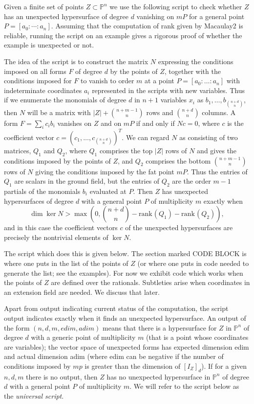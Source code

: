 \documentclass[12pt]{amsart}
\numberwithin{equation}{section}
\theoremstyle{definition}
\newcommand{\PP}{ \ensuremath{\mathbb{P}}}
\newcommand{\rank}{\ensuremath{\mathrm{rank}}\hspace{1pt}}
\begin{document}
Given a finite set of points $Z\subset\PP^n$ we use the following script to check whether $Z$ has an
unexpected hypersurface of degree $d$ vanishing on $mP$ for a general point $P=[a_0:\cdots:a_n]$. 
Assuming that the computation of rank given by Macaulay2 is reliable,
running the script on an example gives a rigorous proof of whether the example is unexpected or not. 

The idea of the script is to construct the matrix $N$ expressing the conditions imposed on
all forms $F$ of degree $d$ by the points of $Z$, together with the conditions imposed for $F$ to vanish to order $m$ at a point
$P=[a_0:\ldots:a_n]$ with indeterminate coordinates $a_i$ represented in the scripts with new variables. 
Thus if we enumerate the monomials of degree $d$ in $n+1$ variables $x_i$
as $b_1,\ldots,b_{\binom{n+d}{n}}$, then $N$ will be a matrix with $|Z|+\binom{n+m-1}{n}$ rows and $\binom{n+d}{n}$ columns.
A form $F=\sum_ic_ib_i$ vanishes on $Z$ and on $mP$ if and only if $Nc=0$, where $c$ is the coefficient vector $c=(c_1,\ldots,c_{\binom{n+d}{n}})^T$.
We can regard $N$ as consisting of two matrices, $Q_1$ and $Q_2$, where $Q_1$ comprises the top $|Z|$ rows of $N$ and gives the conditions
imposed by the points of $Z$, and $Q_2$ comprises the bottom $\binom{n+m-1}{n}$ rows of $N$ giving the conditions imposed
by the fat point $mP$. Thus the entries of $Q_1$ are scalars in the ground field, but the entries of $Q_2$ are the order $m-1$ partials of
the monomials $b_i$ evaluated at $P$. 
Then $Z$ has unexpected hypersurfaces of degree $d$ with a general point $P$ of multiplicity $m$
exactly when 
$$\dim \ker N > \max(0,\binom{n+d}{n}-\rank(Q_1)-\rank(Q_2)),$$
and in this case the coefficient vectors $c$
of the unexpected hypersurfaces are precisely the nontrivial elements of $\ker N$.

The script which does this is given below. The section marked CODE BLOCK is where one puts in the list of the points
of $Z$ (or where one puts in code needed to generate the list; see the examples).
For now we exhibit code which works when the points of $Z$ are defined over the rationals.
Subtleties arise when coordinates in an extension field are needed. We discuss that later.

Apart from output indicating current status of the computation,
the script output indicates exactly when it finds an unexpected hypersurface.
An output of the form $(n,d,m,edim,adim)$ means that there is
a hypersurface for $Z$ in $\PP^n$ of degree $d$ with a generic point
of multiplicity $m$ (that is a point whose coordinates are variables); the vector space of unexpected forms has expected dimension edim
and actual dimension adim (where edim can be negative if the number of conditions
imposed by $mp$ is greater than the dimension of $[I_Z]_d$).
If for a given $n,d,m$ there is no output, then $Z$ has no unexpected hypersurface
in $\PP^n$ of degree $d$ with a general point $P$ of multiplicity $m$.
We will refer to the script below as the {\it universal script}.
\end{document}
